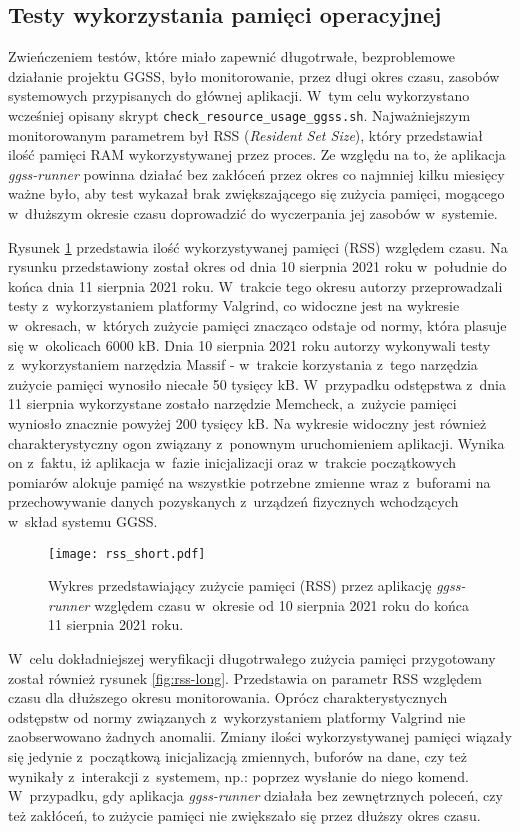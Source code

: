 \subsection{Testy wykorzystania pamięci operacyjnej}

Zwieńczeniem testów, które miało zapewnić długotrwałe, bezproblemowe działanie projektu GGSS, było monitorowanie, przez długi okres czasu, zasobów systemowych przypisanych do głównej aplikacji. W~tym celu wykorzystano wcześniej opisany skrypt \lstinline{check_resource_usage_ggss.sh}. Najważniejszym monitorowanym parametrem był RSS (\emph{Resident Set Size}), który przedstawiał ilość pamięci RAM wykorzystywanej przez proces. Ze względu na to, że aplikacja \emph{ggss-runner} powinna działać bez zakłóceń przez okres co najmniej kilku miesięcy ważne było, aby test wykazał brak zwiększającego się zużycia pamięci, mogącego w~dłuższym okresie czasu doprowadzić do wyczerpania jej zasobów w~systemie.

Rysunek \ref{fig:rss-short} przedstawia ilość wykorzystywanej pamięci (RSS) względem czasu. Na rysunku przedstawiony został okres od dnia 10 sierpnia 2021 roku w~południe do końca dnia 11 sierpnia 2021 roku. W~trakcie tego okresu autorzy przeprowadzali testy z~wykorzystaniem platformy Valgrind, co widoczne jest na wykresie w~okresach, w~których zużycie pamięci znacząco odstaje od normy, która plasuje się w~okolicach 6000 kB. Dnia 10 sierpnia 2021 roku autorzy wykonywali testy z~wykorzystaniem narzędzia Massif - w~trakcie korzystania z~tego narzędzia zużycie pamięci wynosiło niecałe 50 tysięcy kB. W~przypadku odstępstwa z~dnia 11 sierpnia wykorzystane zostało narzędzie Memcheck, a~zużycie pamięci wyniosło znacznie powyżej 200 tysięcy kB. Na wykresie widoczny jest również charakterystyczny ogon związany z~ponownym uruchomieniem aplikacji. Wynika on z~faktu, iż aplikacja w~fazie inicjalizacji oraz w~trakcie początkowych pomiarów alokuje pamięć na wszystkie potrzebne zmienne wraz z~buforami na przechowywanie danych pozyskanych z~urządzeń fizycznych wchodzących w~skład systemu GGSS.

\clearpage
\begin{figure}[H]
    \centering
    \texttt{[image: rss\_short.pdf]}
    \caption{Wykres przedstawiający zużycie pamięci (RSS) przez aplikację \emph{ggss-runner} względem czasu w~okresie od 10 sierpnia 2021 roku do końca 11 sierpnia 2021 roku.}
    \label{fig:rss-short}
\end{figure}

W~celu dokładniejszej weryfikacji długotrwałego zużycia pamięci przygotowany został również rysunek \ref{fig:rss-long}. Przedstawia on parametr RSS względem czasu dla dłuższego okresu monitorowania. Oprócz charakterystycznych odstępstw od normy związanych z~wykorzystaniem platformy Valgrind nie zaobserwowano żadnych anomalii. Zmiany ilości wykorzystywanej pamięci wiązały się jedynie z~początkową inicjalizacją zmiennych, buforów na dane, czy też wynikały z~interakcji z~systemem, np.: poprzez wysłanie do niego komend. W~przypadku, gdy aplikacja \emph{ggss-runner} działała bez zewnętrznych poleceń, czy też zakłóceń, to zużycie pamięci nie zwiększało się przez dłuższy okres czasu.

